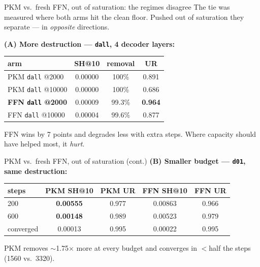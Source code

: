 \documentclass{beamer}
\begin{document}
\begin{frame}{PKM vs.\ fresh FFN, out of saturation: the regimes disagree}
The tie was measured where both arms hit the clean floor. Pushed out of
saturation they separate --- in \emph{opposite} directions.

\medskip
\textbf{(A) More destruction --- \texttt{dall}, 4 decoder layers:}
\begin{center}
\begin{tabular}{|l|c|c|c|}
\hline
arm & SH@10 & removal & UR \\
\hline
PKM \texttt{dall} @2000   & 0.00000 & 100\%  & 0.891 \\
PKM \texttt{dall} @10000  & 0.00000 & 100\%  & 0.686 \\
\textbf{FFN \texttt{dall} @2000}  & 0.00009 & 99.3\% & \textbf{0.964} \\
FFN \texttt{dall} @10000  & 0.00004 & 99.6\% & 0.877 \\
\hline
\end{tabular}
\end{center}
\alert{FFN wins by 7 points} and degrades less with extra steps. Where capacity
should have helped most, it \emph{hurt}.

\end{frame}

\begin{frame}{PKM vs.\ fresh FFN, out of saturation (cont.)}
\textbf{(B) Smaller budget --- \texttt{d01}, same destruction:}
\begin{center}
\begin{tabular}{|l|c|c|c|c|}
\hline
steps & PKM SH@10 & PKM UR & FFN SH@10 & FFN UR \\
\hline
200        & \textbf{0.00555} & 0.977 & 0.00863 & 0.966 \\
600        & \textbf{0.00148} & 0.989 & 0.00523 & 0.979 \\
converged  & 0.00013 & 0.995 & 0.00022 & 0.995 \\
\hline
\end{tabular}
\end{center}
\alert{PKM removes $\sim$1.75$\times$ more at every budget} and converges in
$<$half the steps (1560 vs.\ 3320).
\end{frame}
\end{document}
